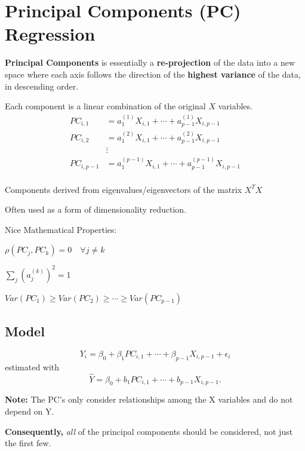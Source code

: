 \documentclass[12pt]{notes}
\begin{document}

\section{Principal Components (PC) Regression}
\textbf{Principal Components} is essentially a \textbf{re-projection} of the data into a new space where each axis follows the direction of the \textbf{highest variance} of the data, in descending order. 
\bi
\item Each component is a linear combination of the original $X$ variables. 
\begin{align*}
PC_{i, 1} &= a_1^{(1)}X_{i, 1} + \cdots + a^{(1)}_{p-1}X_{i, p-1} \\
PC_{i, 2} &= a_1^{(2)}X_{i, 1} + \cdots + a^{(2)}_{p-1}X_{i, p-1} \\
& \vdots \\
PC_{i, p-1} &= a_1^{(p-1)}X_{i, 1} + \cdots + a^{(p-1)}_{p-1}X_{i, p-1} \\
\end{align*}
\item Components derived from eigenvalues/eigenvectors of the matrix $X^TX$
\item Often used as a form of dimensionality reduction. 
\ei

Nice Mathematical Properties:
\bi
\item $\rho(PC_j, PC_k) = 0 \quad \forall j \ne k$
\item $\sum_j\left(a_j^{(k)}\right)^2 = 1$
\item $Var(PC_1) \ge Var(PC_2) \ge \cdots \ge Var(PC_{p-1})$
\ei

\subsection{Model}
$$Y_i = \beta_0 + \beta_1PC_{i, 1} + \cdots + \beta_{p-1}X_{i, p-1} + \epsilon_i$$
estimated with 
$$\hat{Y}= \beta_0 + b_1PC_{i, 1} + \cdots + b_{p-1}X_{i, p-1}.$$

\textbf{Note:} The PC's only consider relationships among the X variables and do not depend on Y. 

\nspace
\textbf{Consequently,} \textit{all} of the principal components should be considered, not just the first few. 


\begin{minipage}[l][2cm][c]{\textwidth}
\end{minipage}
\end{document}
